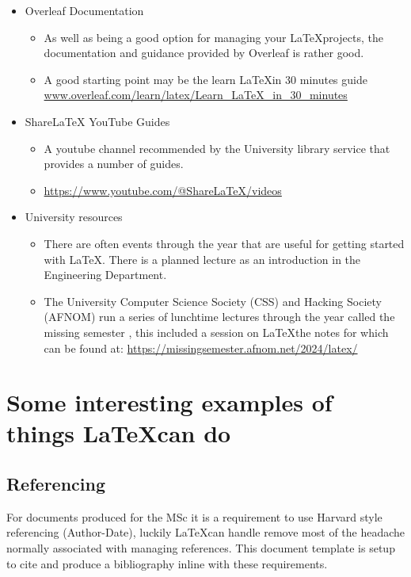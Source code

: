 \begin{itemize}
    \item Overleaf Documentation \parencite{overleaf-documentation}
        \begin{itemize}
            \item As well as being a good option for managing your \LaTeX projects, the documentation and guidance provided by Overleaf is rather good.
            \item A good starting point may be the learn \LaTeX in 30 minutes guide \url{www.overleaf.com/learn/latex/Learn_LaTeX_in_30_minutes}
        \end{itemize}
    \item ShareLaTeX YouTube Guides \parencite{youtube-sharelatex-channel}
        \begin{itemize}
            \item A youtube channel recommended by the University library service that provides a number of guides.
            \item \url{https://www.youtube.com/@ShareLaTeX/videos}
        \end{itemize}
    \item University resources
        \begin{itemize}
            \item There are often events through the year that are useful for getting started with LaTeX. There is a planned lecture as an introduction in the Engineering Department.
            \item The University Computer Science Society (CSS) and Hacking Society (AFNOM)  run a series of lunchtime lectures through the year called the missing semester \parencite{missing-semester}, this included a session on \LaTeX  the notes for which can be found at:  \url{https://missingsemester.afnom.net/2024/latex/}
        \end{itemize}
\end{itemize}

\section{Some interesting examples of things \LaTeX can do}

\subsection{Referencing}
For documents produced for the MSc it is a requirement to use Harvard style referencing (Author-Date), luckily \LaTeX can handle remove most of the headache normally associated with managing references. This document template is setup to cite and produce a bibliography inline with these requirements.

